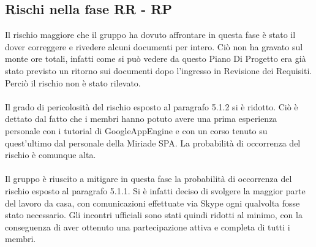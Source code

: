 \subsection{Rischi nella fase RR - RP}
Il rischio maggiore che il gruppo ha dovuto affrontare in questa fase \`e stato il
dover correggere e rivedere alcuni documenti per intero. Ci\`o non ha gravato
sul monte ore totali, infatti come si pu\`o vedere da questo Piano Di Progetto era gi\`a
stato previsto un ritorno sui documenti dopo l'ingresso in Revisione dei
Requisiti. Perci\`o il rischio non \`e stato rilevato.\\
\\
Il grado di pericolosit\`a del rischio esposto al paragrafo 5.1.2 si \`e
ridotto. Ci\`o \`e dettato dal fatto che i membri hanno potuto avere una prima
esperienza personale con i tutorial di GoogleAppEngine e con un corso tenuto su quest'ultimo dal 
personale della Miriade SPA. La probabilit\`a di occorrenza del rischio \`e comunque alta.\\
\\
Il gruppo \`e riuscito a mitigare in questa fase la probabilit\`a di occorrenza del
rischio esposto al paragrafo 5.1.1. Si \`e infatti deciso di svolgere la maggior
parte del lavoro da casa, con comunicazioni effettuate via Skype ogni qualvolta fosse
stato necessario. Gli incontri ufficiali sono stati quindi ridotti al minimo,
con la conseguenza di aver ottenuto una partecipazione attiva e completa di
tutti i membri.\\
\\

\listoftables
{}
\listoffigures
{}

